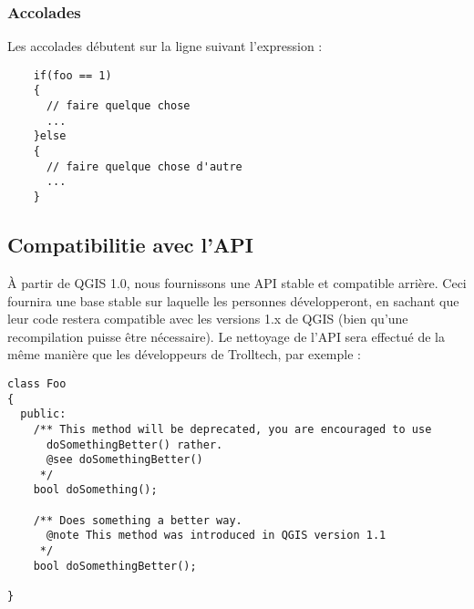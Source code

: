 \subsubsection{Accolades}
Les accolades d\'ebutent sur la ligne suivant l'expression :

\begin{verbatim}
	if(foo == 1)
	{
	  // faire quelque chose
	  ...
 	}else
	{
	  // faire quelque chose d'autre
	  ...
	}
\end{verbatim}

\subsection{Compatibilitie avec l'API}
\`A partir de QGIS 1.0, nous fournissons une API stable et compatible arri\`ere. Ceci fournira une base stable sur laquelle les personnes d\'evelopperont, en sachant que leur code restera compatible avec les versions 1.x de QGIS (bien qu’une recompilation puisse \^etre n\'ecessaire). Le nettoyage de l'API sera effectu\'e de la m\^eme mani\`ere que les d\'eveloppeurs de Trolltech, par exemple :

\begin{verbatim}
class Foo 
{
  public:
    /** This method will be deprecated, you are encouraged to use 
      doSomethingBetter() rather.
      @see doSomethingBetter()
     */
    bool doSomething();

    /** Does something a better way.
      @note This method was introduced in QGIS version 1.1
     */
    bool doSomethingBetter();

}
\end{verbatim}

